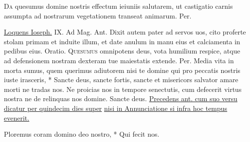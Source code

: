 \begin{multicols*}{2}
\lettrine[lines=2]{\zallmancaps \color{Red} D}{a} quesumus domine nostris effectum ieiuniis salutarem, ut castigatio carnis assumpta ad nostrarum vegetationem transeat animarum. Per.
{\color{Red} }
\par {} \R \hyperlink{loquens-ioseph}{Loquens Ioseph.} {\color{Red} IX. Ad Mag. Ant.} Dixit autem pater ad servos uos, cito proferte stolam primam et induite illum, et date anulum in manu eius et calciamenta in pedibus eius. {\color{Red} Oratio.}
\lettrine[lines=2]{\zallmancaps \color{Blue} Q}{uesumus} omnipotens deus, vota humilium respice, atque ad defensionem nostram dexteram tue maiestatis extende. Per.
 Media vita in morta sumus, quem querimus adiutorem nisi te domine qui pro peccatis nostris iuste irasceris, * Sancte deus, sancte fortis, sancte et misericors salvator amare morti ne tradas nos. \V Ne proicias nos in tempore senectutis, cum defecerit virtus nostra ne de relinquas nos domine. Sancte deus.
\newline \ul{Precedens ant. cum suo versu dicatur per quindecim dies super}  \ul{nisi in Annunciatione si infra hoc tempus evenerit.}
\begin{invitatory}
{Ploremus coram domino deo nostro, * Qui fecit nos.}
\end{invitatory}

\end{multicols*}
